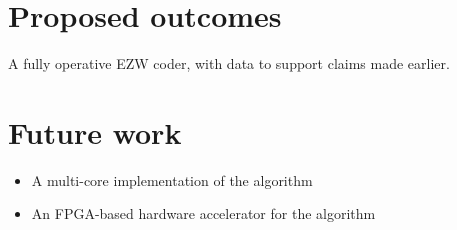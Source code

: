 \documentclass[a4paper,12pt]{report}
\begin{document}
\section{Proposed outcomes}
A fully operative EZW coder, with data to support claims made earlier.

\section{Future work}
\begin{itemize}
    \item A multi-core implementation of the algorithm
    \item An FPGA-based hardware accelerator for the algorithm
\end{itemize}

\printbibliography
\end{document}
